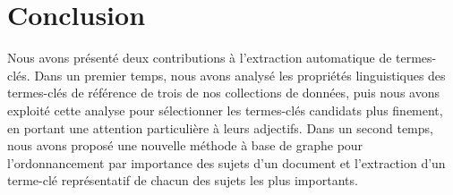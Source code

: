 
  \section{Conclusion}
  \label{sec:main-domain_independent_keyphrase_extraction-conclusion}
    Nous avons présenté deux contributions à l'extraction automatique de
    termes-clés. Dans un premier temps, nous avons analysé les propriétés
    linguistiques des termes-clés de référence de trois de nos collections de
    données, puis nous avons exploité cette analyse pour sélectionner les
    termes-clés candidats plus finement, en portant une attention particulière à
    leurs adjectifs. Dans un second temps, nous avons proposé une nouvelle
    méthode à base de graphe pour l'ordonnancement par importance des sujets
    d'un document et l'extraction d'un terme-clé représentatif de chacun des
    sujets les plus importants.


